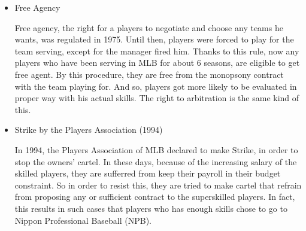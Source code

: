 \documentclass[dvipdfmx, 12pt]{article}
\begin{document}
\begin{itemize}
  \item Free Agency

  Free agency, the right for a players to negotiate and choose any teams he wants, was regulated in 1975. Until then, players were forced to play for the team serving, except for the manager fired him.  Thanks to this rule, now any players who have been serving in MLB for about 6 seasons, are eligible to get free agent. By this procedure, they are free from the monopsony contract with the team playing for. And so, players got more likely to be evaluated in proper way with his actual skills. The right to arbitration is the same kind of this.

  \item Strike by the Players Association (1994)

  In 1994, the Players Association of MLB declared to make Strike, in order to stop the owners' cartel. In these days, because of the increasing salary of the skilled players, they are sufferred from keep their payroll in their budget constraint. So in order to resist this, they are tried to make cartel that refrain from proposing any or sufficient contract to the superskilled players. In fact, this results in such cases that players who has enough skills chose to go to Nippon Professional Baseball (NPB).

\end{itemize}


\end{document}
